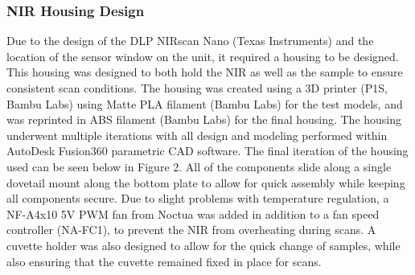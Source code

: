 \documentclass[final, 3p, 11pt]{elsarticle}
\begin{document}
\subsubsection{NIR Housing Design}
Due to the design of the DLP NIRscan Nano (Texas Instruments) and the location of the sensor window on the unit, it required a housing to be designed. This housing was designed to both hold the NIR as well as the sample to ensure consistent scan conditions. The housing was created using a 3D printer (P1S, Bambu Labs) using Matte PLA filament (Bambu Labs) for the test models, and was reprinted in ABS filament (Bambu Labs) for the final housing. 
The housing underwent multiple iterations with all design and modeling performed within AutoDesk Fusion360 parametric CAD software. The final iteration of the housing used can be seen below in Figure 2. All of the components slide along a single dovetail mount along the bottom plate to allow for quick assembly while keeping all components secure. Due to slight problems with temperature regulation, a NF-A4x10 5V PWM fan from Noctua was added in addition to a fan speed controller (NA-FC1), to prevent the NIR from overheating during scans. A cuvette holder was also designed to allow for the quick change of samples, while also ensuring that the cuvette remained fixed in place for scans. 
\end{document}
